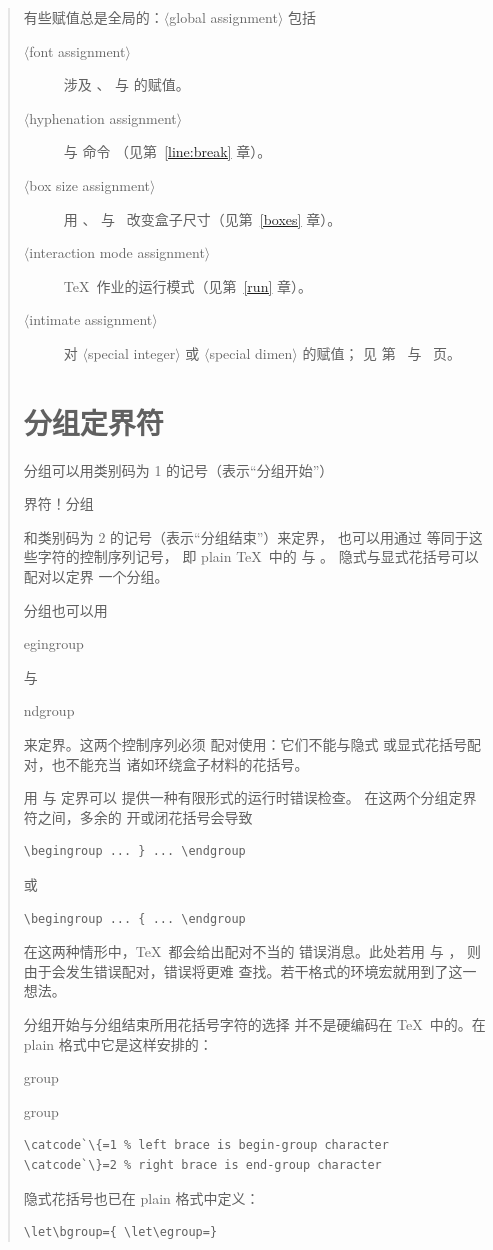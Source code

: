 \documentclass[a4paper]{rapport3}
\makeatletter
\def\gr#1{$\langle$#1$\rangle$}\def\key#1{{\tt#1}}
\newenvironment{disp}{\begin{quotation}}{\end{quotation}}
\def\term#1\par{\index{#1}}
\def\cstoidx#1\par{\index{#1@\cs{#1}}}
\def\csidx#1{\cstoidx #1\par\cs{#1}}
\makeatother
\begin{document}
\begin{disp}
有些赋值总是全局的：\gr{global assignment} 包括
\begin{description}%
\item [\gr{font assignment}]
涉及 、
与  的赋值。
\item [\gr{hyphenation assignment}]
 与  命令
（见第~\ref{line:break} 章）。
\item [\gr{box size assignment}]
用 、 与~
改变盒子尺寸（见第~\ref{boxes} 章）。
\item [\gr{interaction mode assignment}]
\TeX\ 作业的运行模式（见第~\ref{run} 章）。
\item [\gr{intimate assignment}]
对 \gr{special integer} 或 \gr{special dimen} 的赋值；
见 %
第~\pageref{special:int:list} 与~\pageref{special:dimen:list} 页。
\end{description}

\section{分组定界符}

分组可以用类别码为 1 的记号（表示“分组开始”）
\term 定界符！分组\par
和类别码为 2 的记号（表示“分组结束”）来定界，
也可以用通过  等同于这些字符的控制序列记号，
即 plain \TeX\ 中的  与 。
隐式与显式花括号可以配对以定界
一个分组。

分组也可以用 \csidx{begingroup} 与
\csidx{endgroup} 来定界。这两个控制序列必须
配对使用：它们不能与隐式
或显式花括号配对，也不能充当
诸如环绕盒子材料的花括号。

用  与  定界可以
\label{begin:end:macros}%
提供一种有限形式的运行时错误检查。
在这两个分组定界符之间，多余的
开或闭花括号会导致
\begin{verbatim}
\begingroup ... } ... \endgroup
\end{verbatim}
或
\begin{verbatim}
\begingroup ... { ... \endgroup
\end{verbatim}
在这两种情形中，\TeX\ 都会给出配对不当的
错误消息。此处若用  与 ，
则由于会发生错误配对，错误将更难
查找。若干格式的环境宏就用到了这一想法。

分组开始与分组结束所用花括号字符的选择
并不是硬编码在 \TeX\ 中的。在 plain 格式中它是这样安排的：
\cstoidx bgroup\par\cstoidx egroup\par
\begin{verbatim}
\catcode`\{=1 % left brace is begin-group character
\catcode`\}=2 % right brace is end-group character
\end{verbatim}
隐式花括号也已在 plain 格式中定义：
\begin{verbatim}
\let\bgroup={ \let\egroup=}
\end{verbatim}


\end{disp}
\end{document}
